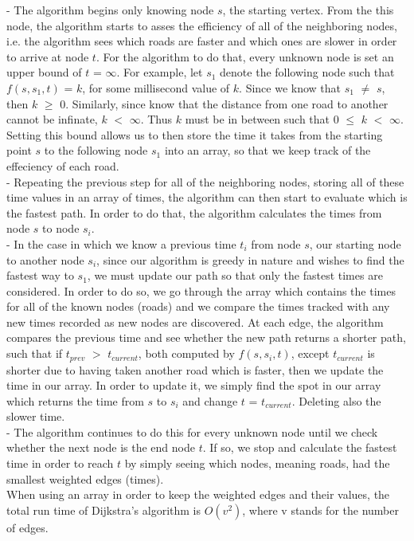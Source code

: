 \documentclass{article}
\begin{document}
\begin{addmargin}[1em]{2em}%
- The algorithm begins only knowing node \(s\), the starting vertex. From the this node, the algorithm starts to asses the efficiency of all of the neighboring nodes, i.e. the algorithm sees which roads are faster and which ones are slower in order to arrive at node \(t\). For the algorithm to do that, every unknown node is set an upper bound of \(t\) = $\infty$. For example, let \(s_1\) denote the following node such that \(f(s,s_1,t)\) = $k$, for some millisecond value of $k$. Since we know that $s_1$ $\neq$ $s$, then $k$ $\geq$ $0$. Similarly, since know that the distance from one road to another cannot be infinate, $k$ $<$ $\infty$. Thus $k$ must be in between such that 0 $\leq$ $k$ $<$ $\infty$. Setting this bound allows us to then store the time it takes from the starting point \(s\) to the following node \(s_1\) into an array, so that we keep track of the effeciency of each road.\\
- Repeating the previous step for all of the neighboring nodes, storing all of these time values in an array of times, the algorithm can then start to evaluate which is the fastest path. In order to do that, the algorithm calculates the times from node $s$ to node $s_i$. \\
- In the case in which we know a previous time \(t_i\) from node \(s\), our starting node to another node \(s_i\), since our algorithm is greedy in nature and wishes to find the fastest way to \(s_1\), we must update our path so that only the fastest times are considered. In order to do so, we go through the array which contains the times for all of the known nodes (roads) and we compare the times tracked with any new times recorded as new nodes are discovered. At each edge, the algorithm compares the previous time and see whether the new path returns a shorter path, such that if $t_{prev}$ $>$ $t_{current}$, both computed by $f(s, s_i, t)$, except $t_{current}$ is shorter due to having taken another road which is faster, then we update the time in our array. In order to update it, we simply find the spot in our array which returns the time from $s$ to $s_i$ and change $t$ = $t_{current}$. Deleting also the slower time.\\
- The algorithm continues to do this for every unknown node until we check whether the next node is the end node $t$. If so, we stop and calculate the fastest time in order to reach $t$ by simply seeing which nodes, meaning roads, had the smallest weighted edges (times).\\

When using an array in order to keep the weighted edges and their values, the total run time of Dijkstra's algorithm is $O(v^2)$, where v stands for the number of edges.
\end{addmargin}
\end{document}
